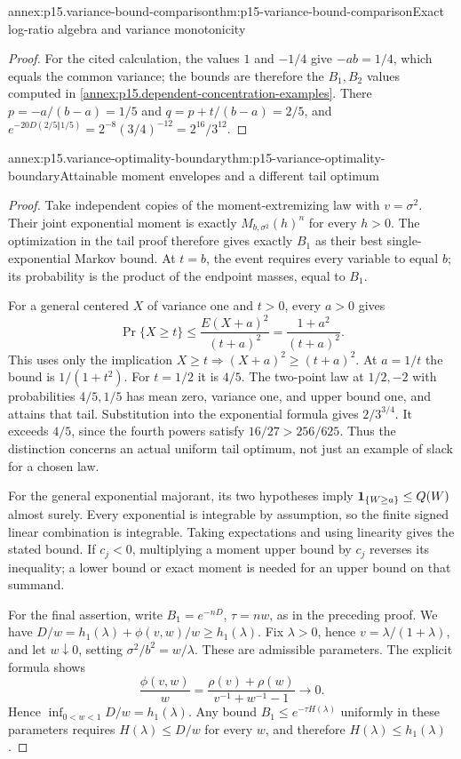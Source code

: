 \begin{annexitem}{annex:p15.variance-bound-comparison}{thm:p15-variance-bound-comparison}{Exact log-ratio algebra and variance monotonicity}
\begin{proof}
For the cited calculation, the values \(1\) and \(-1/4\) give
\(-ab=1/4\), which equals the common variance; the bounds are therefore
the \(B_1,B_2\) values computed in
\cref{annex:p15.dependent-concentration-examples}. There
\(p=-a/(b-a)=1/5\) and \(q=p+t/(b-a)=2/5\), and
\(e^{-20D(2/5\Vert1/5)}=2^{-8}(3/4)^{-12}=2^{16}/3^{12}\).
\end{proof}
\end{annexitem}

\begin{annexitem}{annex:p15.variance-optimality-boundary}{thm:p15-variance-optimality-boundary}{Attainable moment envelopes and a different tail optimum}
\begin{proof}
Take independent copies of the moment-extremizing law with \(v=\sigma^2\).
Their joint exponential moment is exactly \(M_{b,\sigma^2}(h)^n\)
for every \(h>0\). The optimization in the tail proof therefore gives
exactly \(B_1\) as their best single-exponential Markov bound.
At \(t=b\), the event requires every variable to equal \(b\); its
probability is the product of the endpoint masses, equal to \(B_1\).

For a general centered \(X\) of variance one and \(t>0\), every
\(a>0\) gives
\[
 \Pr\{X\geq t\}\leq\frac{E(X+a)^2}{(t+a)^2}
                         =\frac{1+a^2}{(t+a)^2}.
\]
This uses only the implication \(X\geq t\Rightarrow(X+a)^2\geq(t+a)^2\).
At \(a=1/t\) the bound is \(1/(1+t^2)\). For \(t=1/2\) it is \(4/5\).
The two-point law at \(1/2,-2\) with probabilities \(4/5,1/5\)
has mean zero, variance one, and upper bound one, and attains that tail.
Substitution into the exponential formula gives \(2/3^{3/4}\).
It exceeds \(4/5\), since the fourth powers satisfy
\(16/27>256/625\). Thus the distinction concerns an actual uniform
tail optimum, not just an example of slack for a chosen law.

For the general exponential majorant, its two hypotheses imply
\({\bf1}_{\{W\geq a\}}\leq Q(W)\) almost surely.
Every exponential is integrable by assumption, so the finite signed
linear combination is integrable. Taking expectations and using
linearity gives the stated bound. If \(c_j<0\), multiplying a moment
upper bound by \(c_j\) reverses its inequality; a lower bound or exact
moment is needed for an upper bound on that summand.

For the final assertion, write \(B_1=e^{-nD}\),
\(\tau=nw\), as in the preceding proof. We have
\(D/w=h_1(\lambda)+\phi(v,w)/w\geq h_1(\lambda)\).
Fix \(\lambda>0\), hence \(v=\lambda/(1+\lambda)\), and let
\(w\downarrow0\), setting \(\sigma^2/b^2=w/\lambda\).
These are admissible parameters. The explicit formula shows
\[
 \frac{\phi(v,w)}w
 =\frac{\rho(v)+\rho(w)}{v^{-1}+w^{-1}-1}\longrightarrow0.
\]
Hence \(\inf_{0<w<1}D/w=h_1(\lambda)\).
Any bound \(B_1\leq e^{-\tau H(\lambda)}\) uniformly in these
parameters requires \(H(\lambda)\leq D/w\) for every \(w\), and
therefore \(H(\lambda)\leq h_1(\lambda)\).
\end{proof}
\end{annexitem}

